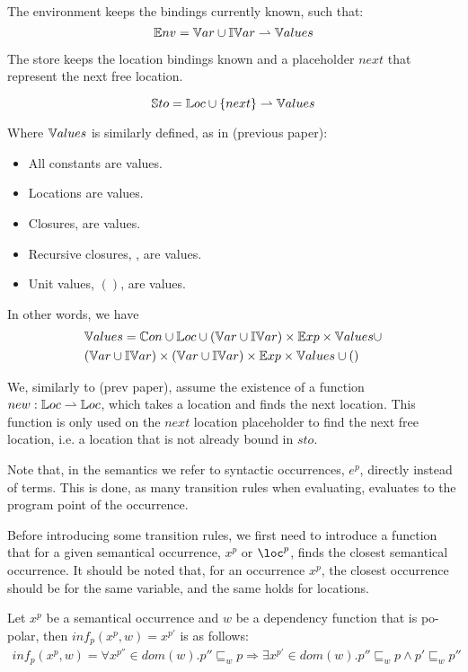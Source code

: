 \documentclass[../../master.tex]{subfiles}
\begin{document}
The environment keeps the bindings currently known, such that:
$$\mathbb{E}nv=\mathbb{V}ar\cup\mathbb{IV}ar\rightharpoonup\mathbb{V}alues$$

The store keeps the location bindings known and a placeholder $next$ that represent the next free location.

$$\mathbb{S}to=\mathbb{L}oc\cup\{next\}\rightharpoonup\mathbb{V}alues$$

Where $\mathbb{V}alues$ is similarly defined, as in (previous paper):
\begin{itemize}
	\item All constants are values.
	\item Locations are values.
	\item Closures,  are values.
	\item Recursive closures, , are values.
	\item Unit values, $()$, are values.
\end{itemize}
In other words, we have
\begin{align*}
	&\mathbb{V}alues=\mathbb{C}on\cup\mathbb{L}oc\cup(\mathbb{V}ar\cup\mathbb{IV}ar)\times\mathbb{E}xp\times\mathbb{V}alues\cup\\
	&(\mathbb{V}ar\cup\mathbb{IV}ar)\times(\mathbb{V}ar\cup\mathbb{IV}ar)\times\mathbb{E}xp\times\mathbb{V}alues\cup()
\end{align*}

We, similarly to (prev paper), assume the existence of a function $new:\mathbb{L}oc\rightharpoonup\mathbb{L}oc$, which takes a location and finds the next location.
This function is only used on the $next$ location placeholder to find the next free location, i.e. a location that is not already bound in $sto$.

Note that, in the semantics we refer to syntactic occurrences, $e^p$, directly instead of terms.
This is done, as many transition rules when evaluating, evaluates to the program point of the occurrence.
\bigskip

Before introducing some transition rules, we first need to introduce a function that for a given semantical occurrence, $x^p$ or $\loc^p$, finds the closest semantical occurrence.
It should be noted that, for an occurrence $x^p$, the closest occurrence should be for the same variable, and the same holds for locations.

\begin{definition}
	Let $x^p$ be a semantical occurrence and $w$ be a dependency function that is po-polar, then $inf_p(x^p,w)=x^{p'}$ is as follows:
	\begin{align*}
		inf_p(x^p,w)=\forall x^{p''}\in dom(w). p''\sqsubseteq_w p\Rightarrow \exists x^{p'}\in dom(w).p''\sqsubseteq_w p\wedge p'\sqsubseteq_w p''
	\end{align*}
\end{definition}
\bigskip
\end{document}
